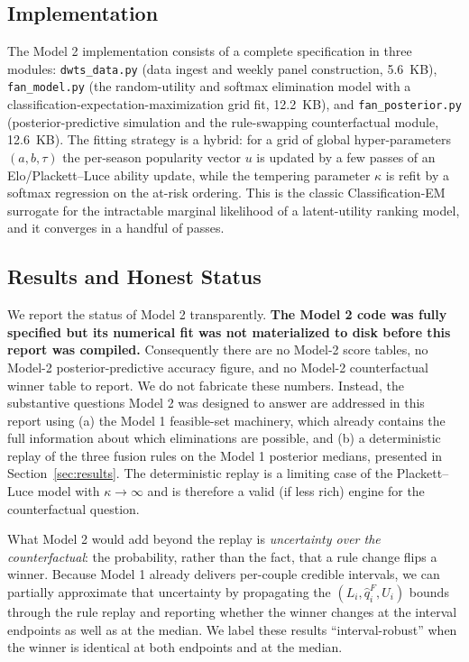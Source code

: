\documentclass{article}
\begin{document}
\subsection{Implementation}

The Model 2 implementation consists of a complete specification in three modules:
\texttt{dwts\_data.py} (data ingest and weekly panel construction, 5.6~KB),
\texttt{fan\_model.py} (the random-utility and softmax elimination model with a
classification-expectation-maximization grid fit, 12.2~KB), and
\texttt{fan\_posterior.py} (posterior-predictive simulation and the rule-swapping
counterfactual module, 12.6~KB). The fitting strategy is a hybrid: for a grid of global
hyper-parameters $(a,b,\tau)$ the per-season popularity vector $u$ is updated by a few
passes of an Elo/Plackett--Luce ability update, while the tempering parameter $\kappa$ is
refit by a softmax regression on the at-risk ordering. This is the classic
Classification-EM surrogate for the intractable marginal likelihood of a latent-utility
ranking model, and it converges in a handful of passes.

\subsection{Results and Honest Status}\label{sec:m2_status}

We report the status of Model 2 transparently. \textbf{The Model 2 code was fully
specified but its numerical fit was not materialized to disk before this report was
compiled.} Consequently there are no Model-2 score tables, no Model-2 posterior-predictive
accuracy figure, and no Model-2 counterfactual winner table to report. We do not fabricate
these numbers. Instead, the substantive questions Model 2 was designed to answer are
addressed in this report using (a) the Model 1 feasible-set machinery, which already
contains the full information about which eliminations are possible, and (b) a
deterministic replay of the three fusion rules on the Model 1 posterior medians, presented
in Section~\ref{sec:results}. The deterministic replay is a limiting case of the
Plackett--Luce model with $\kappa\to\infty$ and is therefore a valid (if less rich) engine
for the counterfactual question.

What Model 2 would add beyond the replay is \emph{uncertainty over the counterfactual}:
the probability, rather than the fact, that a rule change flips a winner. Because Model 1
already delivers per-couple credible intervals, we can partially approximate that
uncertainty by propagating the $(L_i,\hat q^F_i,U_i)$ bounds through the rule replay and
reporting whether the winner changes at the interval endpoints as well as at the median.
We label these results ``interval-robust'' when the winner is identical at both endpoints
and at the median.
\end{document}
